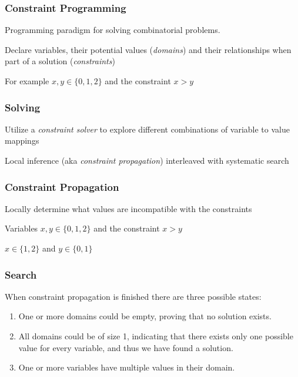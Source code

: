\begin{frame}
	\frametitle{Constraint Programming}

	Programming paradigm for solving combinatorial problems.

	\vspace{0.5cm}

	Declare variables, their potential values (\textit{domains}) and their relationships when
	part of a solution (\textit{constraints})

	\vspace{0.5cm}

	For example $x,y \in \{0,1,2\}$ and the constraint $x > y$

\end{frame}

\begin{frame}
	\frametitle{Solving}

	Utilize a \textit{constraint solver} to explore different combinations of variable to
	value mappings

	\vspace{0.5cm}

	Local inference (aka \textit{constraint propagation}) interleaved with systematic search

\end{frame}

\begin{frame}
	\frametitle{Constraint Propagation}
	Locally determine what values are incompatible with the constraints

	\vspace{0.5cm}

	Variables $x,y \in \{0,1,2\}$ and the constraint $x > y$

	\vspace{0.5cm}

	$x \in \{1,2\}$ and $y \in \{0,1\}$
\end{frame}

\begin{frame}
	\frametitle{Search}

	When constraint propagation is finished there are three possible states:

	\vspace{0.5cm}

	\begin{enumerate}
		\item One or more domains could be empty, proving that no solution exists.
		\item	All domains could be of size 1, indicating that there exists only one possible value for every variable, and thus we have found a solution.
		\item One or more variables have multiple values in their domain.
	\end{enumerate}

\end{frame}

